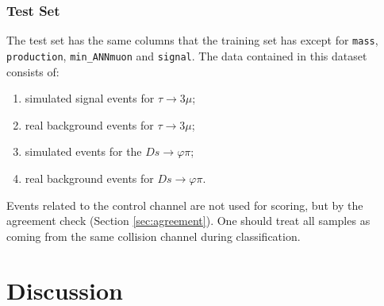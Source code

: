 \documentclass[11pt]{article}
\begin{document}
\subsubsection{Test Set}
\label{sec:test-set}
The test set has the same columns that the training set has except for
\texttt{mass}, \texttt{production}, \texttt{min\_ANNmuon} and \texttt{signal}.
The data contained in this dataset consists of:
\begin{enumerate}
	\item simulated signal events for $\tau \rightarrow 3\mu$;
	\item real background events for $\tau \rightarrow 3\mu$;
	\item simulated events for the $Ds \rightarrow \varphi\pi$;
	\item real background events for $Ds \rightarrow \varphi\pi$.
\end{enumerate}
Events related to the control channel are not used for scoring, but by the
agreement check (Section \ref{sec:agreement}). One should treat all samples as
coming from the same collision channel during classification.

\section{Discussion}
\end{document}
